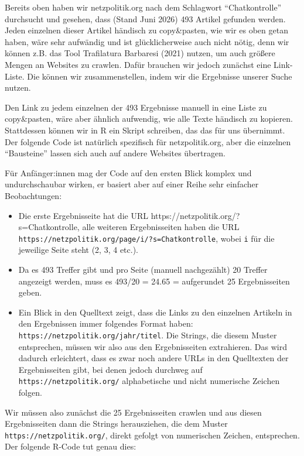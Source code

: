 \documentclass[
  letterpaper,
  DIV=11,
  numbers=noendperiod]{scrreprt}
\begin{document}
Bereits oben haben wir netzpolitik.org nach dem Schlagwort
``Chatkontrolle'' durchsucht und gesehen, dass (Stand Juni 2026) 493
Artikel gefunden werden. Jeden einzelnen dieser Artikel händisch zu
copy\&pasten, wie wir es oben getan haben, wäre sehr aufwändig und ist
glücklicherweise auch nicht nötig, denn wir können z.B. das Tool
Trafilatura Barbaresi (2021) nutzen, um auch größere Mengen an Websites
zu crawlen. Dafür brauchen wir jedoch zunächst eine Link-Liste. Die
können wir zusammenstellen, indem wir die Ergebnisse unserer Suche
nutzen.

Den Link zu jedem einzelnen der 493 Ergebnisse manuell in eine Liste zu
copy\&pasten, wäre aber ähnlich aufwendig, wie alle Texte händisch zu
kopieren. Stattdessen können wir in R ein Skript schreiben, das das für
uns übernimmt. Der folgende Code ist natürlich spezifisch für
netzpolitik.org, aber die einzelnen ``Bausteine'' lassen sich auch auf
andere Websites übertragen.

Für Anfänger:innen mag der Code auf den ersten Blick komplex und
undurchschaubar wirken, er basiert aber auf einer Reihe sehr einfacher
Beobachtungen:

\begin{itemize}
\item
  Die erste Ergebnisseite hat die URL
  https://netzpolitik.org/?s=Chatkontrolle, alle weiteren Ergebnisseiten
  haben die URL
  \texttt{https://netzpolitik.org/page/i/?s=Chatkontrolle}, wobei
  \texttt{i} für die jeweilige Seite steht (2, 3, 4 etc.).
\item
  Da es 493 Treffer gibt und pro Seite (manuell nachgezählt) 20 Treffer
  angezeigt werden, muss es 493/20 = 24.65 = aufgerundet 25
  Ergebnisseiten geben.
\item
  Ein Blick in den Quelltext zeigt, dass die Links zu den einzelnen
  Artikeln in den Ergebnissen immer folgendes Format haben:
  \texttt{https://netzpolitik.org/jahr/titel}. Die Strings, die diesem
  Muster entsprechen, müssen wir also aus den Ergebnisseiten
  extrahieren. Das wird dadurch erleichtert, dass es zwar noch andere
  URLs in den Quelltexten der Ergebnisseiten gibt, bei denen jedoch
  durchweg auf \texttt{https://netzpolitik.org/} alphabetische und nicht
  numerische Zeichen folgen.
\end{itemize}

Wir müssen also zunächst die 25 Ergebnisseiten crawlen und aus diesen
Ergebnisseiten dann die Strings herausziehen, die dem Muster
\texttt{https://netzpolitik.org/}, direkt gefolgt von numerischen
Zeichen, entsprechen. Der folgende R-Code tut genau dies:
\end{document}
